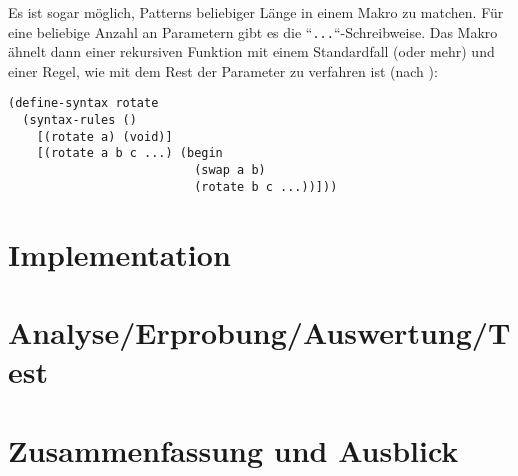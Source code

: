 Es ist sogar möglich, Patterns beliebiger Länge in einem Makro zu matchen. Für eine beliebige Anzahl an Parametern gibt es die ``\texttt{...}``-Schreibweise. Das Makro ähnelt dann einer rekursiven Funktion mit einem Standardfall (oder mehr) und einer Regel, wie mit dem Rest der Parameter zu verfahren ist (nach \cite{racketguide-macros}):

\begin{lstlisting}
(define-syntax rotate
  (syntax-rules ()
    [(rotate a) (void)]
    [(rotate a b c ...) (begin
                          (swap a b)
                          (rotate b c ...))]))
\end{lstlisting}


% 
% 




\chapter{Implementation}  %

\chapter{Analyse/Erprobung/Auswertung/Test}

\chapter{Zusammenfassung und Ausblick}






